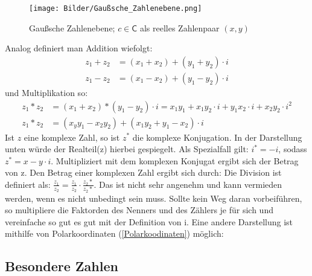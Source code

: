 \documentclass[letterpaper, titlepage]{article}
\begin{document}
\begin{figure}[ht]
    \centering
    \texttt{[image: Bilder/Gaußsche\_Zahlenebene.png]}
    \caption{Gaußsche Zahlenebene; $c \in \mathsf{C}$ als reelles Zahlenpaar $(x,y)$}
    \label{fig:zahlenebene}
\end{figure}



Analog definiert man Addition wiefolgt: 
\\
\begin{align*}
    z_1 + z_2 &= (x_1 + x_2) + (y_1 + y_2)\cdot i \\
    z_1 - z_2 &= (x_1 - x_2) + (y_1 - y_2)\cdot i
\end{align*}
und Multiplikation so:
\\
\begin{align*}
    z_1 * z_2 &= (x_1 + x_2) * (y_1 - y_2)\cdot i = x_1 y_1 + x_1 y_2 \cdot i + y_1 x_2 \cdot i + x_2 y_2 \cdot i^2 \\
    z_1 * z_2 &= (x_y y_1 - x_2 y_2) + (x_1 y_2 + y_1 - x_2)\cdot i 
\end{align*}
\absatzformel
Ist $z$ eine komplexe Zahl, so ist $z^*$ die komplexe Konjugation. In der Darstellung unten würde der Realteil(z) hierbei gespiegelt. Als Spezialfall gilt: $i^* =-i$, sodass $z^* = x -y\cdot i$. Multipliziert mit dem komplexen Konjugat ergibt sich der Betrag von z. 
\skiptwolines
Den Betrag einer komplexen Zahl ergibt sich durch:
Die Division ist definiert als: $\frac{z_1}{z_2} = \frac{z_1}{z_2} \cdot \frac{z_2*}{z_2*}$. Das ist nicht sehr angenehm und kann vermieden werden, wenn es nicht unbedingt sein muss. Sollte kein Weg daran vorbeiführen, so multipliere die Faktorden des Nenners und des Zählers je für sich und vereinfache so gut es gut mit der Definition von i.
\newpage
Eine andere Darstellung ist mithilfe von Polarkoordinaten (\ref{Polarkoodinaten}) möglich:

\vspace{0.7cm}

\subsection{Besondere Zahlen}\label{Besondere Zahlen}

\vspace{0.35cm}
\end{document}

